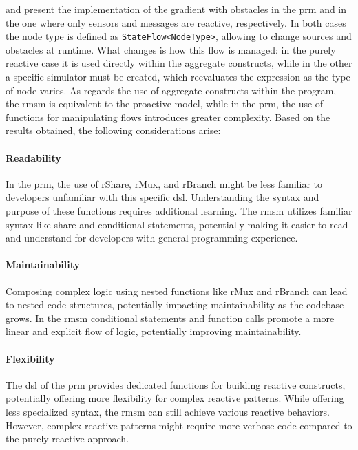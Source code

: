 and  present the implementation of the gradient with obstacles in the \ac{prm} and in the one where only sensors and messages are reactive, respectively. In both cases the node type is defined as \texttt{StateFlow<NodeType>}, allowing to change sources and obstacles at runtime. What changes is how this flow is managed: in the purely reactive case it is used directly within the aggregate constructs, while in the other a specific simulator must be created, which reevaluates the expression as the type of node varies. As regards the use of aggregate constructs within the program, the \ac{rmsm} is equivalent to the proactive model, while in the \ac{prm}, the use of functions for manipulating flows introduces greater complexity. Based on the results obtained, the following considerations arise:


\paragraph{Readability}

In the \ac{prm}, the use of rShare, rMux, and rBranch might be less familiar to developers unfamiliar with this specific \ac{dsl}. Understanding the syntax and purpose of these functions requires additional learning. The \ac{rmsm} utilizes familiar syntax like share and conditional statements, potentially making it easier to read and understand for developers with general programming experience.

\paragraph{Maintainability}

Composing complex logic using nested functions like rMux and rBranch can lead to nested code structures, potentially impacting maintainability as the codebase grows. In the \ac{rmsm} conditional statements and function calls promote a more linear and explicit flow of logic, potentially improving maintainability.

\paragraph{Flexibility}

The \ac{dsl} of the \ac{prm} provides dedicated functions for building reactive constructs, potentially offering more flexibility for complex reactive patterns. While offering less specialized syntax, the \ac{rmsm} can still achieve various reactive behaviors. However, complex reactive patterns might require more verbose code compared to the purely reactive approach.

